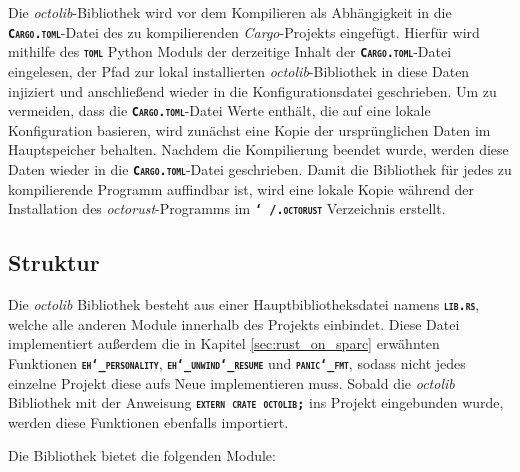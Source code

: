 Die \textit{octolib}-Bibliothek wird vor dem Kompilieren als Abhängigkeit in die \texttt{\textsc{\textbf{Cargo.toml}}}-Datei des
zu kompilierenden \textit{Cargo}-Projekts eingefügt.
Hierfür wird mithilfe des \texttt{\textsc{\textbf{toml}}} Python Moduls der derzeitige Inhalt der \texttt{\textsc{\textbf{Cargo.toml}}}-Datei
eingelesen, der Pfad zur lokal installierten \textit{octolib}-Bibliothek in diese Daten injiziert und anschließend 
wieder in die Konfigurationsdatei geschrieben.
Um zu vermeiden, dass die \texttt{\textsc{\textbf{Cargo.toml}}}-Datei Werte enthält, die auf eine lokale Konfiguration basieren, wird zunächst
eine Kopie der ursprünglichen Daten im Hauptspeicher behalten. Nachdem die Kompilierung beendet
wurde, werden diese Daten wieder in die \texttt{\textsc{\textbf{Cargo.toml}}}-Datei geschrieben.
Damit die Bibliothek für jedes zu kompilierende Programm auffindbar ist,
wird eine lokale Kopie während der Installation des \textit{octorust}-Programms im
\texttt{\textsc{\textbf{\char`~/.octorust}}} Verzeichnis erstellt.

\subsection{Struktur}

Die \textit{octolib} Bibliothek besteht aus einer Hauptbibliotheksdatei namens \texttt{\textsc{\textbf{lib.rs}}},
welche alle anderen Module innerhalb des Projekts einbindet. Diese
Datei implementiert außerdem die in Kapitel \ref{sec:rust_on_sparc} erwähnten Funktionen
\texttt{\textsc{\textbf{eh\char`_personality}}}, \texttt{\textsc{\textbf{eh\char`_unwind\char`_resume}}} und
\texttt{\textsc{\textbf{panic\char`_fmt}}}, sodass nicht jedes einzelne Projekt diese aufs Neue implementieren muss. 
Sobald die \textit{octolib} Bibliothek mit der Anweisung \texttt{\textsc{\textbf{extern crate octolib;}}}
ins Projekt eingebunden wurde, werden diese Funktionen ebenfalls importiert.

Die Bibliothek bietet die folgenden Module:

